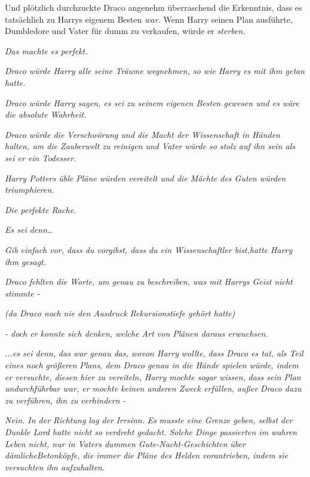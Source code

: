 {Und plötzlich durchzuckte Draco angenehm überraschend die Erkenntnis, dass es tatsächlich zu Harrys eigenem Besten \emph{war.} Wenn Harry seinen Plan ausführte, Dumbledore und Vater für dumm zu verkaufen, würde er \emph{sterben.}

\emph{Das machte es} \emph{\emph{perfekt.}}

\emph{Draco würde Harry alle seine Träume wegnehmen, so wie Harry es mit ihm getan hatte.}

\emph{Draco würde Harry sagen, es sei zu seinem eigenen Besten gewesen und es wäre die absolute Wahrheit.}

\emph{Draco würde die Verschwörung und die Macht der Wissenschaft in Händen halten, um die Zauberwelt zu reinigen und Vater würde so stolz auf ihn sein als sei er ein Todesser.}

\emph{Harry Potters üble Pläne würden vereitelt und die Mächte des Guten würden triumphieren.}

\emph{Die perfekte Rache.}

\emph{Es sei denn…}

\emph{\emph{G}\emph{ib einfach vor, dass du vorgibst, dass du ein Wissenschaftler bist,}hatte Harry ihm gesagt.}

\emph{Draco fehlten die Worte, um genau zu beschreiben, was mit Harrys Geist nicht stimmte -}

\emph{(da Draco noch} \emph{nie den Ausdruck} \emph{\emph{Rekursionstiefe}} \emph{gehört hatte)}

\emph{- doch er konnte sich denken, welche Art von Plänen daraus erwuchsen.}

\emph{...es sei denn,} \emph{das war genau das, wovon Harry} \emph{\emph{wollte,}} \emph{dass Draco es tat, als Teil eines noch} \emph{\emph{größeren}} \emph{Plans, dem Draco} \emph{\emph{genau in die Hände}} \emph{spielen würde, indem er versuchte, diesen hier zu vereiteln, Harry mochte sogar} \emph{\emph{wissen,}} \emph{dass sein Plan undurchführbar war, er mochte keinen anderen Zweck erfüllen,} \emph{\emph{außer}} \emph{Draco dazu zu verführen, ihn zu} \emph{verhindern -}

\emph{Nein. In der Richtung lag der} \emph{\emph{Irrsinn.}} \emph{Es} \emph{\emph{musste}} \emph{eine Grenze geben, selbst der Dunkle Lord hatte nicht} \emph{\emph{so}} \emph{verdreht gedacht. Solche Dinge passierten im wahren Leben nicht, nur in Vaters dummen Gute-Nacht-Geschichten} \emph{über} \emph{dämlicheBetonköpfe, die immer die} \emph{Pläne des Helden} \emph{vorantrieben, indem sie versuchten ihn aufzuhalten.}

}
